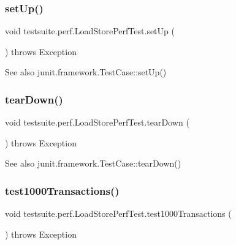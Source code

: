 \subsubsection{\texorpdfstring{set\+Up()}{setUp()}}
{\footnotesize\ttfamily void testsuite.\+perf.\+Load\+Store\+Perf\+Test.\+set\+Up (\begin{DoxyParamCaption}{ }\end{DoxyParamCaption}) throws Exception}

\begin{DoxySeeAlso}{See also}
junit.\+framework.\+Test\+Case\+::set\+Up() 
\end{DoxySeeAlso}
\mbox{\label{classtestsuite_1_1perf_1_1_load_store_perf_test_a8c9cc35a3ee0fc42720dc2090ec300b5}} 
\subsubsection{\texorpdfstring{tear\+Down()}{tearDown()}}
{\footnotesize\ttfamily void testsuite.\+perf.\+Load\+Store\+Perf\+Test.\+tear\+Down (\begin{DoxyParamCaption}{ }\end{DoxyParamCaption}) throws Exception}

\begin{DoxySeeAlso}{See also}
junit.\+framework.\+Test\+Case\+::tear\+Down() 
\end{DoxySeeAlso}
\mbox{\label{classtestsuite_1_1perf_1_1_load_store_perf_test_a0092e8eee45c82e1e740f52b0e93cd42}} 
\subsubsection{\texorpdfstring{test1000\+Transactions()}{test1000Transactions()}}
{\footnotesize\ttfamily void testsuite.\+perf.\+Load\+Store\+Perf\+Test.\+test1000\+Transactions (\begin{DoxyParamCaption}{ }\end{DoxyParamCaption}) throws Exception}

